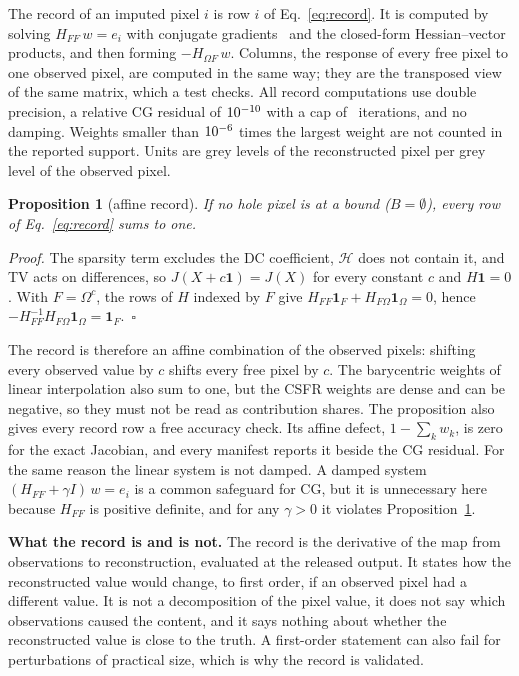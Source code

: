 \documentclass[final,3p]{elsarticle}
\newtheorem{proposition}{Proposition}
\begin{document}
The record of an imputed pixel $i$ is row $i$ of Eq.~\eqref{eq:record}. It is computed by solving $H_{FF}\, w = e_{i}$ with conjugate gradients~\cite{hestenes1952methods} and the closed-form Hessian--vector products, and then forming $-H_{\Omega F}\, w$. Columns, the response of every free pixel to one observed pixel, are computed in the same way; they are the transposed view of the same matrix, which a test checks. All record computations use double precision, a relative CG residual of $10^{-10}$ with a cap of \recCGmax\ iterations, and no damping. Weights smaller than $10^{-6}$ times the largest weight are not counted in the reported support. Units are grey levels of the reconstructed pixel per grey level of the observed pixel.

\begin{proposition}[affine record]
\label{prop:affine}
If no hole pixel is at a bound ($B = \emptyset$), every row of Eq.~\eqref{eq:record} sums to one.
\end{proposition}
\textit{Proof.} The sparsity term excludes the DC coefficient, $\mathcal{H}$ does not contain it, and TV acts on differences, so $J(X + c\mathbf{1}) = J(X)$ for every constant $c$ and $H\mathbf{1} = 0$. With $F = \Omega^{c}$, the rows of $H$ indexed by $F$ give $H_{FF}\mathbf{1}_{F} + H_{F\Omega}\mathbf{1}_{\Omega} = 0$, hence $-H_{FF}^{-1} H_{F\Omega}\mathbf{1}_{\Omega} = \mathbf{1}_{F}$.~$\square$

The record is therefore an affine combination of the observed pixels: shifting every observed value by $c$ shifts every free pixel by $c$. The barycentric weights of linear interpolation also sum to one, but the CSFR weights are dense and can be negative, so they must not be read as contribution shares. The proposition also gives every record row a free accuracy check. Its affine defect, $1 - \sum_{k} w_{k}$, is zero for the exact Jacobian, and every manifest reports it beside the CG residual. For the same reason the linear system is not damped. A damped system $(H_{FF} + \gamma I)\,w = e_{i}$ is a common safeguard for CG, but it is unnecessary here because $H_{FF}$ is positive definite, and for any $\gamma > 0$ it violates Proposition~\ref{prop:affine}.

\textbf{What the record is and is not.} The record is the derivative of the map from observations to reconstruction, evaluated at the released output. It states how the reconstructed value would change, to first order, if an observed pixel had a different value. It is not a decomposition of the pixel value, it does not say which observations caused the content, and it says nothing about whether the reconstructed value is close to the truth. A first-order statement can also fail for perturbations of practical size, which is why the record is validated.
\end{document}
